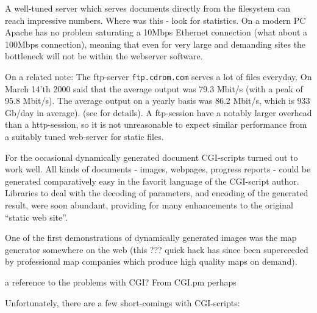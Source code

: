 A well-tuned server which serves documents directly from the
filesystem can reach impressive numbers.  \textsf{Where was this -
look for statistics}.  On a modern PC Apache has no problem saturating
a 10Mbps Ethernet connection (\textsf{what about a 100Mbps
connection)}, meaning that even for very large and demanding sites the
bottleneck will not be within the webserver software.

On a related note: The ftp-server \texttt{ftp.cdrom.com} serves a lot
of files everyday.  On March 14'th 2000
 said that the average output was 79.3 Mbit/s (with a
peak of 95.8 Mbit/s).  The average output on a yearly basis was 86.2
Mbit/s, which is 933 Gb/day in average).
(see  for details).  A
ftp-session have a notably larger overhead than a http-session, so it
is not unreasonable to expect similar performance from a suitably
tuned web-server for static files.

For the occasional dynamically generated document CGI-scripts turned
out to work well.  All kinds of documents - images, webpages, progress
reports - could be generated comparatively easy in the favorit
language of the CGI-script author.  Libraries to deal with the
decoding of parameters, and encoding of the generated result, were
soon abundant, providing for many enhancements to the original
``static web site''.

\label{sec:map-generation-first-web-application} One of the first
demonstrations of dynamically generated images was the \textsf{map
generator somewhere on the web (this ??? quick hack has since been
superceeded by professional map companies which produce high quality
maps on demand)}.


\textsf{a reference to the problems with CGI?  From CGI.pm perhaps}

Unfortunately, there are a few short-comings with CGI-scripts:

